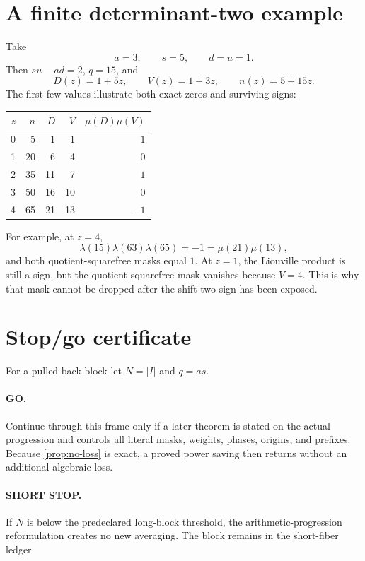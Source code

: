 \documentclass[11pt]{article}
\theoremstyle{definition}
\theoremstyle{remark}
\begin{document}
\section{A finite determinant-two example}

Take
\[
 a=3,\qquad s=5,\qquad d=u=1.
\]
Then \(su-ad=2\), \(q=15\), and
\[
 D(z)=1+5z,\qquad V(z)=1+3z,\qquad n(z)=5+15z.
\]
The first few values illustrate both exact zeros and surviving
signs:
\begin{center}
\begin{tabular}{@{}rrrrr@{}}
\toprule
\(z\)&\(n\)&\(D\)&\(V\)&\(\mu(D)\mu(V)\)\\
\midrule
0&5 &1 &1 & \(1\)\\
1&20&6 &4 & \(0\)\\
2&35&11&7 & \(1\)\\
3&50&16&10& \(0\)\\
4&65&21&13& \(-1\)\\
\bottomrule
\end{tabular}
\end{center}
For example, at \(z=4\),
\[
 \lambda(15)\lambda(63)\lambda(65)=-1
 =\mu(21)\mu(13),
\]
and both quotient-squarefree masks equal \(1\).  At \(z=1\), the
Liouville product is still a sign, but the quotient-squarefree mask
vanishes because \(V=4\).  This is why that mask cannot be dropped
after the shift-two sign has been exposed.

\section{Stop/go certificate}

For a pulled-back block let \(N=|I|\) and \(q=as\).

\paragraph{GO.}
Continue through this frame only if a later theorem is stated on the
actual progression and controls all literal masks, weights, phases,
origins, and prefixes.  Because \cref{prop:no-loss} is exact, a
proved power saving then returns without an additional algebraic
loss.

\paragraph{SHORT STOP.}
If \(N\) is below the predeclared long-block threshold, the
arithmetic-progression reformulation creates no new averaging.  The
block remains in the short-fiber ledger.
\end{document}
